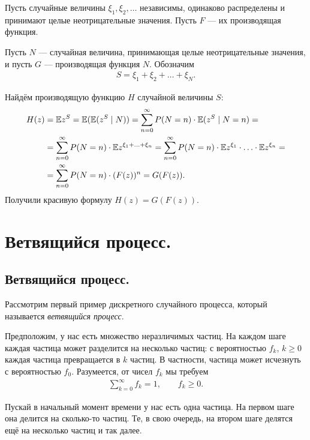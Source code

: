 \documentclass[../main.tex]{subfiles}
\begin{document}
\begin{exmpl}
 \label{example:genfun_of_random_number_of_random_values}
 Пусть случайные величины $ \xi_1, \xi_2, \ldots $  независимы, одинаково распределены и принимают целые неотрицательные значения. Пусть $ F $ --- их производящая функция.

 Пусть  $ N $  --- случайная величина, принимающая целые неотрицательные значения, и пусть $ G $  --- производящая функция $ N $. Обозначим
 \begin{align*}
  S = \xi_1 + \xi_2 + \ldots + \xi_N.
 \end{align*}

 Найдём производящую функцию $ H $ случайной величины $ S $:
 \begin{align*}
  H(z) &= \mathbb E z^{S} = \mathbb E(\mathbb E(z^{S} \mid N)) = \sum_{n=0}^{\infty} P(N=n) \cdot \mathbb E(z^{S} \mid N = n) = \\
  &= \sum_{n=0}^{\infty}P(N=n) \cdot \mathbb E z^{\xi_1+\ldots+\xi_n} = \sum_{n=0}^{\infty} P(N=n) \cdot \mathbb E z^{\xi_1} \cdot \ldots \cdot \mathbb E z^{\xi_n} = \\
  &= \sum_{n=0}^{\infty} P(N=n) \cdot (F(z))^{n} = G(F(z)).
 \end{align*} Получили красивую формулу $ H(z) = G(F(z)) $.
\end{exmpl}

\newpage
\section{Ветвящийся процесс.}

\subsection{Ветвящийся процесс.}

Рассмотрим первый пример дискретного случайного процесса, который называется \textit{ветвящийся процесс}.

Предположим, у нас есть множество неразличимых частиц. На каждом шаге каждая частица может разделится на несколько частиц: с вероятностью $ f_k $,  $ k \geqslant 0 $ каждая частица превращается в $ k $  частиц.  В частности, частица может исчезнуть с вероятностью $ f_0 $. Разумеется, от чисел $ f_k $ мы требуем
\begin{align*}
 \sum_{k=0}^{\infty}f_k = 1, \qquad f_k \geqslant 0.
\end{align*}

Пускай в начальный момент времени у нас есть одна частица. На первом шаге она делится на сколько-то частиц. Те, в свою очередь, на втором шаге делятся ещё на несколько частиц и так далее.
\end{document}
